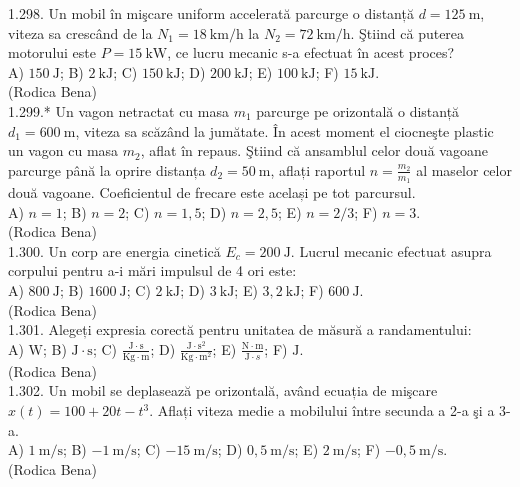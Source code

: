 {1.298. Un mobil în mişcare uniform accelerată parcurge o distanță $d=125 \mathrm{~m}$, viteza sa crescând de la $N_{1}=18 \mathrm{~km} / \mathrm{h}$ la $N_{2}=72 \mathrm{~km} / \mathrm{h}$. Ştiind că puterea motorului este $P=15 \mathrm{~kW}$, ce lucru mecanic s-a efectuat în acest proces?\\ A) $150 \mathrm{~J}$; B) $2 \mathrm{~kJ}$; C) $150 \mathrm{~kJ}$; D) $200 \mathrm{~kJ}$; E) $100 \mathrm{~kJ}$; F) $15 \mathrm{~kJ}$.\\ (Rodica Bena)\\

1.299.* Un vagon netractat cu masa $m_{1}$ parcurge pe orizontală o distanță $d_{1}=600 \mathrm{~m}$, viteza sa scăzând la jumătate. În acest moment el ciocneşte plastic un vagon cu masa $m_{2}$, aflat în repaus. Ştiind că ansamblul celor două vagoane parcurge până la oprire distanța $d_{2}=50 \mathrm{~m}$, aflați raportul $n=\frac{m_{2}}{m_{1}}$ al maselor celor două vagoane. Coeficientul de frecare este același pe tot parcursul.\\ A) $n=1$; B) $n=2$; C) $n=1,5$; D) $n=2,5$; E) $n=2 / 3$; F) $n=3$.\\ (Rodica Bena)\\

1.300. Un corp are energia cinetică $E_{c}=200 \mathrm{~J}$. Lucrul mecanic efectuat asupra corpului pentru a-i mări impulsul de 4 ori este:\\ A) $800 \mathrm{~J}$; B) $1600 \mathrm{~J}$; C) $2 \mathrm{~kJ}$; D) $3 \mathrm{~kJ}$; E) $3,2 \mathrm{~kJ}$; F) $600 \mathrm{~J}$.\\ (Rodica Bena)\\

1.301. Alegeți expresia corectă pentru unitatea de măsură a randamentului:\\ A) $\mathrm{W}$; B) $\mathrm{J} \cdot \mathrm{s}$; C) $\frac{\mathrm{J} \cdot \mathrm{s}}{\mathrm{Kg} \cdot \mathrm{m}}$; D) $\frac{\mathrm{J} \cdot \mathrm{s}^{2}}{\mathrm{Kg} \cdot \mathrm{m}^{2}}$; E) $\frac{\mathrm{N} \cdot \mathrm{m}}{\mathrm{J} \cdot s}$; F) $\mathrm{J}$.\\ (Rodica Bena)\\

1.302. Un mobil se deplasează pe orizontală, având ecuația de mişcare $x(t)=100+20 t-t^{3}$. Aflați viteza medie a mobilului între secunda a 2-a şi a 3-a.\\ A) $1 \mathrm{~m} / \mathrm{s}$; B) $-1 \mathrm{~m} / \mathrm{s}$; C) $-15 \mathrm{~m} / \mathrm{s}$; D) $0,5 \mathrm{~m} / \mathrm{s}$; E) $2 \mathrm{~m} / \mathrm{s}$; F) $-0,5 \mathrm{~m} / \mathrm{s}$.\\ (Rodica Bena)\\

}
